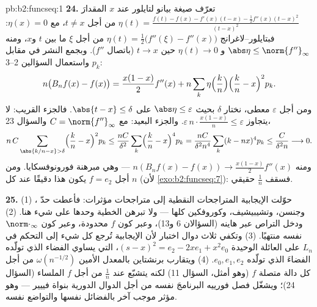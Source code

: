 \begin{solution}{pb:b2:funcseq:1}
\textbf{24.} تعرّف صيغة بيانو لتايلور عند $x$ المقدارَ $\eta(t) =
\frac{f(t) - f(x) - f'(x)(t-x) - \frac12f''(x)(t-x)^2}
{(t-x)^2}$ من أجل $t \neq x$، مع $\eta(x) = 0$: فبتايلور--لاغرانج
$\eta(t) = \frac12\bigl(f''(\xi) - f''(x)\bigr)$ من أجل $\xi$ ما
بين $t$ و$x$، ومنه $\abs\eta \leq \norm{f''}_\infty$ و
$\eta(t) \to 0$ حين $t \to x$ (باتصال $f''$). وبجمع
النشر في مقابل $p_k$ واستعمال السؤالين 2--3:
\[
n\bigl(B_nf(x) - f(x)\bigr)
= \frac{x(1-x)}{2}f''(x)
+ n\sum_k\eta\Bigl(\frac kn\Bigr)\Bigl(\frac kn -
x\Bigr)^2p_k .
\]
ومن أجل $\varepsilon$ معطى، نختار $\delta$ بحيث $\abs\eta \leq
\varepsilon$ على $\abs{t - x}\leq\delta$. فالجزء القريب: لا يتجاوز
$\varepsilon\,n\cdot\frac{x(1-x)}n \leq \varepsilon$. والجزء البعيد:
مع $C = \norm{f''}_\infty$ والسؤال 23،
\[
n\,C\sum_{\abs{k/n-x}>\delta}\Bigl(\frac kn -
x\Bigr)^2p_k
\leq \frac{nC}{\delta^2}\sum_k\Bigl(\frac kn -
x\Bigr)^4p_k
= \frac{nC}{\delta^2 n^4}\sum_k(k-nx)^4p_k
\leq \frac{C}{\delta^2 n} \longrightarrow 0 .
\]
ومنه $n(B_nf(x) - f(x)) \to \frac{x(1-x)}2f''(x)$ ---
وهي مبرهنة فورونوفسكايا. ومن أجل $f = e_2$ يكون هذا دقيقًا عند كل
$n$ (لأن \cref{exo:b2:funcseq:7}): فسقف $\frac1n$ حقيقي.

\textbf{25.} (1) حوّلت الإيجابية المتراجحات النقطية إلى
متراجحات مؤثرات: فأعطت حدّ ، وجنسن،
وتشيبيشيف، وكوروفكين كلها --- ولا تبرهن الخطية وحدها
على شيء هنا. (2) ودخل التراص عبر هاينه (السؤالان
6 و13)، وعبر كون $f$ محدودة، وعبر كون 
$\norm\cdot_\infty$ نفسه منتهيًا. (3) وتكفي ثلاث دوال اختبار
لأن الإيجابية تُرجع كل شيء إلى التحكم في
$L_n$ على العائلة الوحيدة $(s-x)^2 = e_2 - 2xe_1 + x^2e_0$،
التي يساوي الفضاء الذي تولّده الفضاءَ الذي تولّده $e_0, e_1, e_2$. (4) ويتقارب برنشتاين
بالمعدل الأمين $\omega(n^{-1/2})$ من أجل كل دالة متصلة $f$
(وهو أمثل، السؤال 11) لكنه يتشبّع عند $\frac1n$ من أجل $f$ الملساء
(السؤال 24)؛ ويشغّل فصل فورييه البرنامجَ نفسه من أجل
الدوال الدورية بنواة فييير --- وهو مؤثر موجب
آخر بالفضائل نفسها والتواضع نفسه.
\end{solution}
